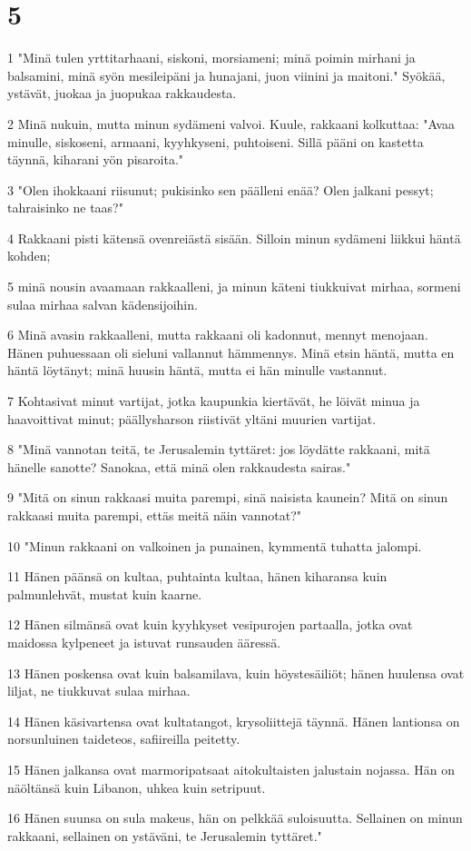 \chapter{5}

\par 1 "Minä tulen yrttitarhaani, siskoni, morsiameni; minä poimin mirhani ja balsamini, minä syön mesileipäni ja hunajani, juon viinini ja maitoni." Syökää, ystävät, juokaa ja juopukaa rakkaudesta.
\par 2 Minä nukuin, mutta minun sydämeni valvoi. Kuule, rakkaani kolkuttaa: "Avaa minulle, siskoseni, armaani, kyyhkyseni, puhtoiseni. Sillä pääni on kastetta täynnä, kiharani yön pisaroita."
\par 3 "Olen ihokkaani riisunut; pukisinko sen päälleni enää? Olen jalkani pessyt; tahraisinko ne taas?"
\par 4 Rakkaani pisti kätensä ovenreiästä sisään. Silloin minun sydämeni liikkui häntä kohden;
\par 5 minä nousin avaamaan rakkaalleni, ja minun käteni tiukkuivat mirhaa, sormeni sulaa mirhaa salvan kädensijoihin.
\par 6 Minä avasin rakkaalleni, mutta rakkaani oli kadonnut, mennyt menojaan. Hänen puhuessaan oli sieluni vallannut hämmennys. Minä etsin häntä, mutta en häntä löytänyt; minä huusin häntä, mutta ei hän minulle vastannut.
\par 7 Kohtasivat minut vartijat, jotka kaupunkia kiertävät, he löivät minua ja haavoittivat minut; päällysharson riistivät yltäni muurien vartijat.
\par 8 "Minä vannotan teitä, te Jerusalemin tyttäret: jos löydätte rakkaani, mitä hänelle sanotte? Sanokaa, että minä olen rakkaudesta sairas."
\par 9 "Mitä on sinun rakkaasi muita parempi, sinä naisista kaunein? Mitä on sinun rakkaasi muita parempi, ettäs meitä näin vannotat?"
\par 10 "Minun rakkaani on valkoinen ja punainen, kymmentä tuhatta jalompi.
\par 11 Hänen päänsä on kultaa, puhtainta kultaa, hänen kiharansa kuin palmunlehvät, mustat kuin kaarne.
\par 12 Hänen silmänsä ovat kuin kyyhkyset vesipurojen partaalla, jotka ovat maidossa kylpeneet ja istuvat runsauden ääressä.
\par 13 Hänen poskensa ovat kuin balsamilava, kuin höystesäiliöt; hänen huulensa ovat liljat, ne tiukkuvat sulaa mirhaa.
\par 14 Hänen käsivartensa ovat kultatangot, krysoliittejä täynnä. Hänen lantionsa on norsunluinen taideteos, safiireilla peitetty.
\par 15 Hänen jalkansa ovat marmoripatsaat aitokultaisten jalustain nojassa. Hän on näöltänsä kuin Libanon, uhkea kuin setripuut.
\par 16 Hänen suunsa on sula makeus, hän on pelkkää suloisuutta. Sellainen on minun rakkaani, sellainen on ystäväni, te Jerusalemin tyttäret."

